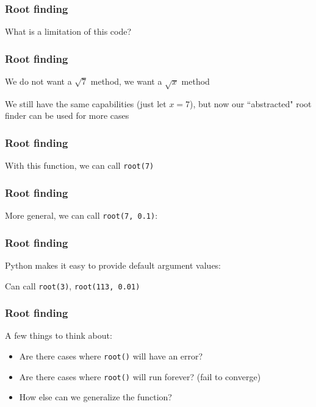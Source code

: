 \documentclass{beamer}
\begin{document}
\begin{frame}
\frametitle{Root finding}

What is a limitation of this code?



\end{frame}

\begin{frame}
\frametitle{Root finding}
We do not want a $\sqrt{7}$ method, we want a $\sqrt{x}$ method

\vspace{0.2in}

We still have the same capabilities (just let $x = 7$), but now our ``abstracted" root finder can be used for more cases
\end{frame}


\begin{frame}
\frametitle{Root finding}

With this function, we can call \texttt{root(7)}



\end{frame}

\begin{frame}
\frametitle{Root finding}
More general, we can call \texttt{root(7, 0.1)}:



\end{frame}


\begin{frame}
\frametitle{Root finding}
Python makes it easy to provide default argument values:



Can call \texttt{root(3)}, \texttt{root(113, 0.01)}
\end{frame}

\begin{frame}
\frametitle{Root finding}
A few things to think about:
\vspace{0.1in}
\begin{itemize}
\setlength{\itemsep}{0.1in}
\item{Are there cases where \texttt{root()} will have an error?}
\item{Are there cases where \texttt{root()} will run forever? (fail to converge)}
\item{How else can we generalize the function?}
\end{itemize}
\end{frame}
\end{document}
